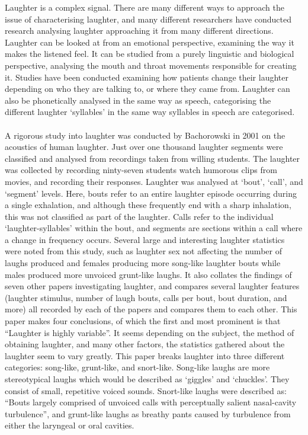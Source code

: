 \documentclass[a4paper,11pt,notitlepage]{article}
\begin{document}
Laughter is a complex signal. There are many different ways to approach the issue of characterising laughter, and many different researchers have conducted research analysing laughter approaching it from many different directions. Laughter can be looked at from an emotional perspective, examining the way it makes the listened feel. It can be studied from a purely linguistic and biological perspective, analysing the mouth and throat movements responsible for creating it. Studies have been conducted examining how patients change their laughter depending on who they are talking to, or where they came from. Laughter can also be phonetically analysed in the same way as speech, categorising the different laughter `syllables' in the same way syllables in speech are categorised.\\
\\
A rigorous study into laughter was conducted by Bachorowski in 2001\cite{bachorowski2001acoustic} on the acoustics of human laughter. Just over one thousand laughter segments were classified and analysed from recordings taken from willing students. The laughter was collected by recording ninty-seven students watch humorous clips from movies, and recording their responses. Laughter was analysed at `bout', `call', and `segment' levels. Here, bouts refer to an entire laughter episode occurring during a single exhalation, and although these frequently end with a sharp inhalation, this was not classified as part of the laughter. Calls refer to the individual `laughter-syllables' within the bout, and segments are sections within a call where a change in frequency occurs. Several large and interesting laughter statistics were noted from this study, such as laughter sex not affecting the number of laughs produced and females producing more song-like laughter bouts while males produced more unvoiced grunt-like laughs. It also collates the findings of seven other papers investigating laughter, and compares several laughter features (laughter stimulus, number of laugh bouts, calls per bout, bout duration, and more) all recorded by each of the papers and compares them to each other. This paper makes four conclusions, of which the first and most prominent is that ``Laughter is highly variable''. It seems depending on the subject, the method of obtaining laughter, and many other factors, the statistics gathered about the laughter seem to vary greatly. This paper breaks laughter into three different categories: song-like, grunt-like, and snort-like. Song-like laughs are more stereotypical laughs which would be described as `giggles' and `chuckles'. They consist of small, repetitive voiced sounds. Snort-like laughs were described as: ``Bouts largely comprised of unvoiced calls with perceptually salient nasal-cavity turbulence'', and grunt-like laughs as breathy pants caused by turbulence from either the laryngeal or oral cavities.\cite{bachorowski2001acoustic}
\end{document}
